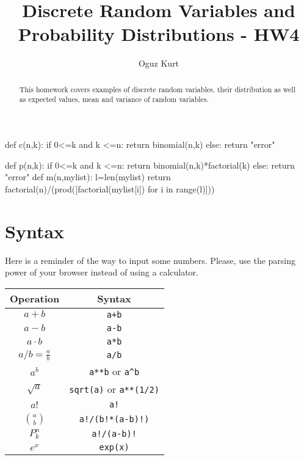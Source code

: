 \documentclass{ximera}
\title{Discrete Random Variables and Probability Distributions - HW4}
\author{Oguz Kurt}
\begin{document}
\begin{abstract}
This homework covers examples of discrete random variables, their distribution as well as expected values, mean and variance of random variables.
\end{abstract}
\maketitle

\begin{sagesilent}
def c(n,k):
    if 0<=k and k <=n:
        return binomial(n,k)
    else:
        return "error"

def p(n,k):
    if 0<=k and k <=n:
        return binomial(n,k)*factorial(k)
    else:
        return "error"
def m(n,mylist):
    l=len(mylist)
    return factorial(n)/(prod([factorial(mylist[i]) for i in range(l)]))
\end{sagesilent}

\section*{Syntax}
Here is a reminder of the way to input some numbers. Please, use the parsing power of your browser instead of using a calculator.

\hspace{0.5cm}


\begin{tabular}{c|c}
Operation & Syntax  
\\
\hline
$a+b$ & {\color{red} \verb!a+b!} 
\\
\hline
$a- b$ & {\color{red} \verb!a-b!} 
\\
\hline
$a\cdot b$ & {\color{red} \verb!a*b! } 
\\
\hline
$a/b=\frac{a}{b}$ & {\color{red} \verb!a/b!}
\\
\hline
$a^b$ & {\color{red} \verb|a**b| or \verb|a^b|} 
\\
\hline
$\sqrt{a}$ & {\color{red} \verb|sqrt(a)| or \verb|a**(1/2)|} 
\\
\hline
$a!$ & {\color{red} \verb|a!|} 
\\
\hline
$\binom{a}{b}$ & {\color{red} \verb|a!/(b!*(a-b)!)|}
\\
\hline
$P_k^n$ & {\color{red} \verb|a!/(a-b)!|}
\\
\hline
$e^x$ & {\color{red} \verb|exp(x)|}
\\
\end{tabular}

\hspace{1cm}
\end{document}
